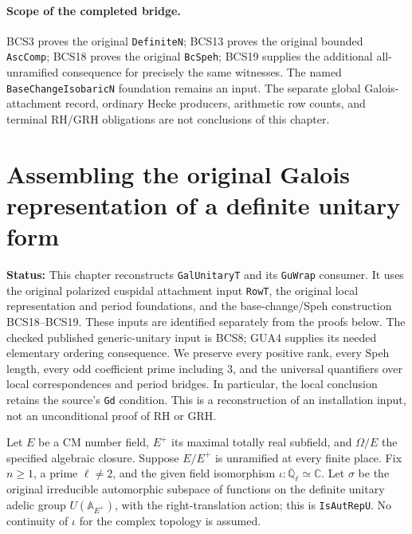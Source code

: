 \documentclass[11pt,a4paper]{article}
\numberwithin{equation}{section}
\theoremstyle{remark}\newtheorem{remark}[theorem]{Remark}
\newcommand{\status}[1]{\textbf{Status:} #1}
\begin{document}
\paragraph{Scope of the completed bridge.}
BCS3 proves the original \texttt{Definite\allowbreak N}; BCS13 proves the original
bounded \texttt{Asc\allowbreak Comp}; BCS18 proves the original \texttt{Bc\allowbreak Speh};
BCS19 supplies the additional all-unramified consequence for precisely
the same witnesses.  The named \texttt{Base\allowbreak Change\allowbreak Isobaric\allowbreak N} foundation
remains an input.  The separate global Galois-attachment record,
ordinary Hecke producers, arithmetic row counts, and terminal RH/GRH
obligations are not conclusions of this chapter.


\section{Assembling the original Galois representation of a definite unitary form}
\label{sec:galois-assembly-v44}

\status{This chapter reconstructs \texttt{Gal\allowbreak Unitary\allowbreak T} and its
\texttt{Gu\allowbreak Wrap} consumer.  It uses the original polarized cuspidal
attachment input \texttt{Row\allowbreak T}, the original local representation and
period foundations, and the base-change/Speh construction BCS18--BCS19.
These inputs are identified separately from the proofs below.  The
checked published generic-unitary input is BCS8; GUA4 supplies its
needed elementary ordering consequence.  We preserve every positive rank,
every Speh length, every odd coefficient prime including $3$, and
the universal quantifiers over local correspondences and period
bridges.  In particular, the local conclusion retains the source's
\texttt{Gd} condition.  This is a reconstruction of an installation
input, not an unconditional proof of RH or GRH.}

Let $E$ be a CM number field, $E^+$ its maximal totally real
subfield, and $\Omega/E$ the specified algebraic closure.  Suppose
$E/E^+$ is unramified at every finite place.  Fix $n\geq1$, a prime
$\ell\ne2$, and the given field isomorphism
$\iota:\overline{\mathbb Q}_\ell\simeq\mathbb C$.
Let $\sigma$ be the original irreducible automorphic subspace of
functions on the definite unitary adelic group $U(\mathbb A_{E^+})$,
with the right-translation action; this is \texttt{Is\allowbreak Aut\allowbreak Rep\allowbreak U}.
No continuity of $\iota$ for the complex topology is assumed.
\end{document}
